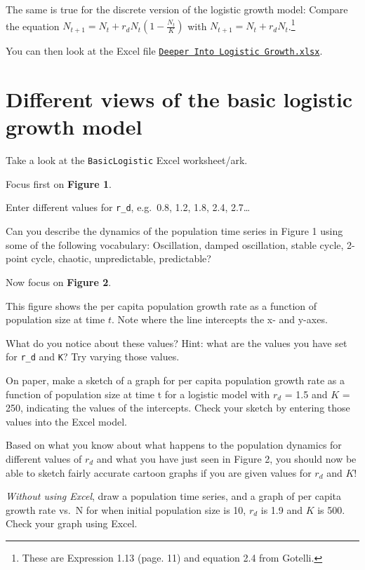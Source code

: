 \documentclass[
  a4paper]{book}
\begin{document}
The same is true for the discrete version of the logistic growth model:
Compare the equation
\(N_{t+1}=N_{t}+r_{d} N_{t}\left(1-\frac{N_{t}}{K}\right)\) with
\(N_{t+1}=N_{t}+r_{d} N_{t}\).\footnote{These are Expression 1.13 (page.
  11) and equation 2.4 from Gotelli.}

You can then look at the Excel file
\href{https://www.dropbox.com/s/4xq399z7skl1akv/Deeper\%20into\%20Logistic\%20Growth.xlsx?dl=1}{\texttt{Deeper\ Into\ Logistic\ Growth.xlsx}}.

\hypertarget{different-views-of-the-basic-logistic-growth-model}{%
\section{Different views of the basic logistic growth
model}\label{different-views-of-the-basic-logistic-growth-model}}

Take a look at the \texttt{BasicLogistic} Excel worksheet/ark.

Focus first on \textbf{Figure 1}.

Enter different values for \texttt{r\_d}, e.g.~0.8, 1.2, 1.8, 2.4,
2.7\ldots{}

Can you describe the dynamics of the population time series in Figure 1
using some of the following vocabulary: Oscillation, damped oscillation,
stable cycle, 2-point cycle, chaotic, unpredictable, predictable?

Now focus on \textbf{Figure 2}.

This figure shows the per capita population growth rate as a function of
population size at time \(t\). Note where the line intercepts the x- and
y-axes.

What do you notice about these values? Hint: what are the values you
have set for \texttt{r\_d} and \texttt{K}? Try varying those values.

On paper, make a sketch of a graph for per capita population growth rate
as a function of population size at time t for a logistic model with
\(r_d\) = 1.5 and \(K\) = 250, indicating the values of the intercepts.
Check your sketch by entering those values into the Excel model.

Based on what you know about what happens to the population dynamics for
different values of \(r_d\) and what you have just seen in Figure 2, you
should now be able to sketch fairly accurate cartoon graphs if you are
given values for \(r_d\) and \(K\)!

\emph{Without using Excel}, draw a population time series, and a graph
of per capita growth rate vs.~N for when initial population size is 10,
\(r_d\) is 1.9 and \(K\) is 500. Check your graph using Excel.
\end{document}
